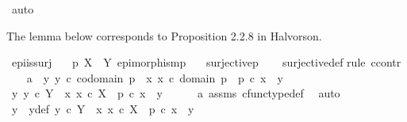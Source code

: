 \begin{isabellebody}
\ auto%
\endisatagproof
{\isafoldproof}%
%
\isadelimproof
%
\endisadelimproof
%
\begin{isamarkuptext}%
The lemma below corresponds to Proposition 2.2.8 in Halvorson.%
\end{isamarkuptext}\isamarkuptrue%
\isamarkupfalse%
\ epi{\isacharunderscore}{\kern0pt}is{\isacharunderscore}{\kern0pt}surj{\isacharcolon}{\kern0pt}\isanewline
\ \ \ {\isachardoublequoteopen}p{\isacharcolon}{\kern0pt}\ X\ {\isasymrightarrow}\ Y{\isachardoublequoteclose}\ {\isachardoublequoteopen}epimorphism{\isacharparenleft}{\kern0pt}p{\isacharparenright}{\kern0pt}{\isachardoublequoteclose}\isanewline
\ \ \ {\isachardoublequoteopen}surjective{\isacharparenleft}{\kern0pt}p{\isacharparenright}{\kern0pt}{\isachardoublequoteclose}\isanewline
%
\isadelimproof
\ \ %
\endisadelimproof
%
\isatagproof
{}\isamarkupfalse%
\ surjective{\isacharunderscore}{\kern0pt}def\isanewline
{}\isamarkupfalse%
{\isacharparenleft}{\kern0pt}rule\ ccontr{\isacharparenright}{\kern0pt}\isanewline
\ \ \isamarkupfalse%
\ a{}{\isacharcolon}{\kern0pt}\ {\isachardoublequoteopen}{\isasymnot}\ {\isacharparenleft}{\kern0pt}{\isasymforall}y{\isachardot}{\kern0pt}\ y\ {\isasymin}\isactrlsub c\ codomain\ p\ {\isasymlongrightarrow}\ {\isacharparenleft}{\kern0pt}{\isasymexists}x{\isachardot}{\kern0pt}\ x\ {\isasymin}\isactrlsub c\ domain\ p\ {\isasymand}\ p\ {\isasymcirc}\isactrlsub c\ x\ {\isacharequal}{\kern0pt}\ y{\isacharparenright}{\kern0pt}{\isacharparenright}{\kern0pt}{\isachardoublequoteclose}\isanewline
\ \ \isamarkupfalse%
\ {\isachardoublequoteopen}{\isasymexists}y{\isachardot}{\kern0pt}\ y\ {\isasymin}\isactrlsub c\ Y\ {\isasymand}\ {\isasymnot}{\isacharparenleft}{\kern0pt}{\isasymexists}x{\isachardot}{\kern0pt}\ x\ {\isasymin}\isactrlsub c\ X\ {\isasymand}\ p\ {\isasymcirc}\isactrlsub c\ x\ {\isacharequal}{\kern0pt}\ y{\isacharparenright}{\kern0pt}{\isachardoublequoteclose}\isanewline
\ \ \ \ \isamarkupfalse%
\ a{}\ assms{\isacharparenleft}{\kern0pt}{}{\isacharparenright}{\kern0pt}\ cfunc{\isacharunderscore}{\kern0pt}type{\isacharunderscore}{\kern0pt}def\ \isamarkupfalse%
\ auto\isanewline
\ \ \isamarkupfalse%
\ \isamarkupfalse%
\ y{}\ \ y{\isacharunderscore}{\kern0pt}def{\isacharcolon}{\kern0pt}\ {\isachardoublequoteopen}y{}\ {\isasymin}\isactrlsub c\ Y\ {\isasymand}\ {\isacharparenleft}{\kern0pt}{\isasymforall}x{\isachardot}{\kern0pt}\ x\ {\isasymin}\isactrlsub c\ X\ {\isasymlongrightarrow}\ p\ {\isasymcirc}\isactrlsub c\ x\ {\isasymnoteq}\ y{}{\isacharparenright}{\kern0pt}{\isachardoublequoteclose}\isanewline

\end{isabellebody}

